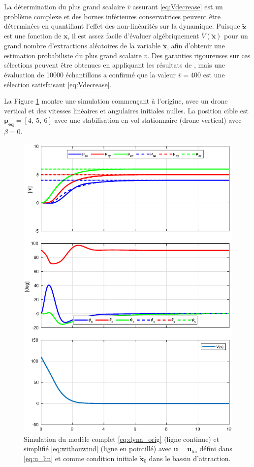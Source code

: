 La détermination du plus grand scalaire $\bar v$ assurant \eqref{eq:Vdecrease} est un problème complexe et des bornes inférieures conservatrices peuvent être déterminées en quantifiant l'effet des non-linéarités sur la dynamique. Puisque $\boldsymbol{\dot{\tilde x}}$ est une fonction de $\boldsymbol{x}$, il est assez facile d'évaluer algébriquement $\dot V(\boldsymbol{\tilde x})$ pour un grand nombre d'extractions aléatoires de la variable $\boldsymbol{\tilde x}$, afin d'obtenir une estimation probabiliste du plus grand scalaire $\bar v$. Des garanties rigoureuses sur ces sélections peuvent être obtenues en appliquant les résultats de \cite{tempo2013randomized}, mais une évaluation de 10000 échantillons a confirmé que la valeur $\bar v = 400$ est une sélection satisfaisant \eqref{eq:Vdecrease}.

La Figure \ref{fig_linearize_conv} montre une simulation commençant à l'origine, avec un drone vertical et des vitesses linéaires et angulaires initiales nulles. La position cible est $\boldsymbol{p_{\text{eq}}} = [4,~5,~6]$ avec une stabilisation en vol stationnaire (drone vertical) avec $\beta = 0$.

\begin{figure}[ht!]
    \centering
    \includegraphics[trim=0cm 0.6cm 0cm 1cm,clip,width=0.8\columnwidth]{figures/converge2.eps}
    \caption{Simulation du modèle complet \eqref{eq:dyna_orig} (ligne continue) et simplifié \eqref{eq:withouwind} (ligne en pointillé) avec $\boldsymbol{u} = \boldsymbol{u}_{\text{lin}}$ défini dans 
    \eqref{eq:u_lin} et comme condition initiale $\tilde{ \boldsymbol{x}}_0$ dans le bassin d'attraction.}
    \label{fig_linearize_conv}
\end{figure}

